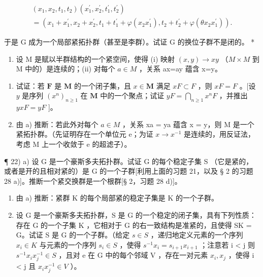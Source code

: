 \[
\begin{array}{l} \left(x _ {1}, x _ {2}, t _ {1}, t _ {2}\right) \left(x _ {1} ^ {\prime}, x _ {2} ^ {\prime}, t _ {1} ^ {\prime}, t _ {2} ^ {\prime}\right) \\ = \left(x _ {1} + x _ {1} ^ {\prime}, x _ {2} + x _ {2} ^ {\prime}, t _ {1} + t _ {1} ^ {\prime} + \varphi \left(x _ {2} x _ {1} ^ {\prime}\right), t _ {2} + t _ {2} ^ {\prime} + \varphi \left(\theta x _ {2} x _ {1} ^ {\prime}\right)\right). \end{array}
\]

于是 G 成为一个局部紧拓扑群（甚至是李群）。试证 G 的换位子群不是闭的。 *

\begin{enumerate}
\def\labelenumi{\arabic{enumi})}
\setcounter{enumi}{20}
\tightlist
\item
  设 M 是赋以半群结构的一个紧空间，使得 (i) 映射 \((x,y)\to xy\) （\(M\times M\) 到 M 中的）是连续的；(ii) 对每个 \(a\in M\) ，关系 ax=ay 蕴含 x=y。
\end{enumerate}

\begin{enumerate}
\def\labelenumi{\alph{enumi})}
\item
  试证：若 \(\mathbf{F}\) 是 \(\mathbf{M}\) 的一个闭子集，且 \(x \in \mathbf{M}\) 满足 \(xF \subset F\) ，则 \(xF = F\) 。{[}设 \(y\) 是序列 \((x^n)_{n \geqslant 1}\) 在 \(\mathbf{M}\) 中的一个聚点；试证 \(yF = \bigcap_{n \geqslant 1} x^n F\) ，并推出 \(yxF = yF\) {]}。
\item
  由 a) 推断：若此外对每个 \(a \in M\) ，关系 xa = ya 蕴含 x = y，则 M 是一个紧拓扑群。（先证明存在一个单位元 e；为证 \(x \to x^{-1}\) 是连续的，用反证法，考虑 M 上一个收敛于 e 的超滤子）。
\end{enumerate}

¶ 22) a) 设 G 是一个豪斯多夫拓扑群。试证 G 的每个稳定子集 S （它是紧的，或者是开的且相对紧的）是 G 的一个子群{[}利用上面的习题 21，以及 § 2 的习题 28 a){]}。推断一个紧交换群是一个根群{[}§ 2，习题 28 d){]}。

\begin{enumerate}
\def\labelenumi{\alph{enumi})}
\setcounter{enumi}{1}
\item
  由 a) 推断：紧群 K 的每个局部紧的稳定子集是 K 的一个子群。
\item
  设 G 是一个豪斯多夫拓扑群，S 是 G 的一个稳定的闭子集，具有下列性质：存在 G 的一个子集 K ，它相对于 G 的右一致结构是准紧的，且使得 SK = G。试证 S 是 G 的一个子群。（给定 \(s \in S\) ，递归地定义元素的一个序列 \(x_{i} \in K\) 与元素的一个序列 \(s_{i} \in S\) ，使得 \(s^{-1}x_{i} = s_{i+1}x_{i+1}\) ；注意若 i \textless{} j 则 \(s^{-1}x_{i}x^{-1}_{j} \in S\) ，且对 e 在 G 中的每个邻域 V ，存在一对元素 \(x_{i}, x_{j}\) ，使得 i \textless{} j 且 \(x_{i}x^{-1}_{j} \in V\) ）。
\end{enumerate}

